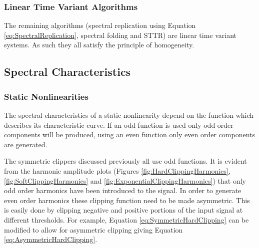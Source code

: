 		\subsubsection*{Linear Time Variant Algorithms}
			The remaining algorithms (spectral replication using Equation \ref{eq:SpectralReplication}, spectral
			folding and STTR) are linear time variant systems. As such they all satisfy the principle of
			homogeneity.

%			
%
%			

	\subsection{Spectral Characteristics}
	\label{sec:ExcitationEvaluation-Comparison-SpectralCharacteristics}
		\subsubsection*{Static Nonlinearities}
			The spectral characteristics of a static nonlinearity depend on the function which describes its
			characteristic curve. If an odd function is used only odd order components will be produced, using
			an even function only even order components are generated. 

			The symmetric clippers discussed previously all use odd functions. It is evident from the harmonic
			amplitude plots (Figures \ref{fig:HardClippingHarmonics}, \ref{fig:SoftClippingHarmonics} and
			\ref{fig:ExponentialClippingHarmonics}) that only odd order harmonics have been introduced to the
			signal. In order to generate even order harmonics these clipping function need to be made
			asymmetric. This is easily done by clipping negative and positive portions of the input signal at
			different thresholds. For example, Equation \ref{eq:SymmetricHardClipping} can be modified to allow
			for asymmetric clipping giving Equation \ref{eq:AsymmetricHardClipping}.
			
